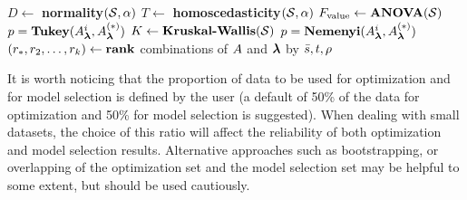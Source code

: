 \begin{algorithm}
\begin{algorithmic}[1]
\State $D \gets $ \textbf{normality}$(\mathcal{S},\alpha)$ %
\State $T \gets $ \textbf{homoscedasticity}$(\mathcal{S},\alpha)$ 
\State $F_{\textrm{value}} \gets \textrm{\textbf{ANOVA}}(\mathcal{S})$   %
\State $p = \textrm{\textbf{Tukey}}(A^i _{\boldsymbol{\lambda}}, A^{(\ast)}_{\boldsymbol{\lambda}})$ %
\EndFor
\EndIf
\vspace{1mm}
\State $K \gets \textrm{\textbf{Kruskal-Wallis}}(\mathcal{S})$   %
\State $p = \textrm{\textbf{Nemenyi}}(A^i _{\boldsymbol{\lambda}}, A^{(\ast)}_{\boldsymbol{\lambda}})$
\EndFor
\EndIf
\EndIf
\State $(r_*,r_2,\ldots, r_k) \gets \textrm{\textbf{rank}}$ combinations of $A$ and $\boldsymbol{\lambda}$ by $\bar{s}, t, \rho$ 
\EndFunction
\end{algorithmic}
	\label{alg:statistical_test}
\end{algorithm}



It is worth noticing that the proportion of data to be used for optimization and for model selection
is defined by the user (a default of 50\% of the data for optimization and 50\% for model selection
is suggested). When dealing with small datasets, the choice of this ratio will affect the
reliability of both optimization and model selection results. Alternative approaches such as
bootstrapping, or overlapping of the optimization set and the model selection set may be helpful to
some extent, but should be used cautiously.


